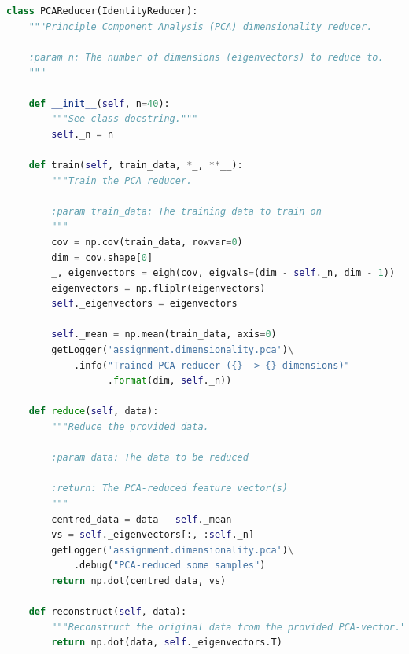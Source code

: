 \documentclass[a4paper, 11pt, twocolumn, final]{article} %
\begin{document}
\begin{lstlisting}[language=Python, style=python]
class PCAReducer(IdentityReducer):
    """Principle Component Analysis (PCA) dimensionality reducer.

    :param n: The number of dimensions (eigenvectors) to reduce to.
    """

    def __init__(self, n=40):
        """See class docstring."""
        self._n = n

    def train(self, train_data, *_, **__):
        """Train the PCA reducer.

        :param train_data: The training data to train on
        """
        cov = np.cov(train_data, rowvar=0)
        dim = cov.shape[0]
        _, eigenvectors = eigh(cov, eigvals=(dim - self._n, dim - 1))
        eigenvectors = np.fliplr(eigenvectors)
        self._eigenvectors = eigenvectors

        self._mean = np.mean(train_data, axis=0)
        getLogger('assignment.dimensionality.pca')\
            .info("Trained PCA reducer ({} -> {} dimensions)"
                  .format(dim, self._n))

    def reduce(self, data):
        """Reduce the provided data.

        :param data: The data to be reduced

        :return: The PCA-reduced feature vector(s)
        """
        centred_data = data - self._mean
        vs = self._eigenvectors[:, :self._n]
        getLogger('assignment.dimensionality.pca')\
            .debug("PCA-reduced some samples")
        return np.dot(centred_data, vs)

    def reconstruct(self, data):
        """Reconstruct the original data from the provided PCA-vector."""
        return np.dot(data, self._eigenvectors.T)

\end{lstlisting}
\end{document}
